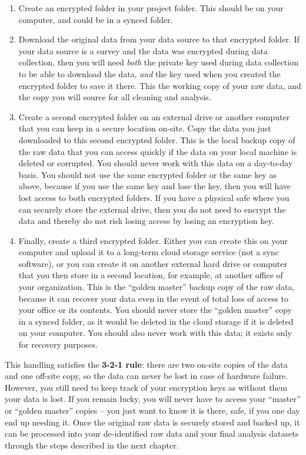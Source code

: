 \begin{enumerate}
	\item Create an encrypted folder in your project folder.
	This should be on your computer, and could be in a synced folder.

	\item Download the original data from your data source to that encrypted folder.
	If your data source is a survey and the data was encrypted during data collection,
	then you will need \textit{both} the
	private key used during data collection to be able to download the data,
	\textit{and} the key used when you created the encrypted folder to save it there.
	This the working copy of your raw data, and the copy you will source for all cleaning and analysis.

	\item Create a second encrypted folder on an external drive or another computer that you can keep in a secure location on-site.
	Copy the data you just downloaded to this second encrypted folder.
	This is the local backup copy of the raw data
	that you can access quickly if the data on your local machine is deleted or corrupted.
	You should never work with this data on a day-to-day basis.
	You should not use the same encrypted folder or the same key as above,
	because if you use the same key and lose the key,
	then you will have lost access to both encrypted folders.
	If you have a physical safe where you can securely store the external drive,
	then you do not need to encrypt the data
	and thereby do not risk losing access by losing an encryption key.

	\item Finally, create a third encrypted folder.
	Either you can create this on your computer and upload it to a long-term cloud storage service (not a sync software),
	or you can create it on	another external hard drive or computer that you then store in a second location,
	for example, at another office of your organization.
	This is the ``golden master'' backup copy of the raw data,
	because it can recover your data even in the event of
	total loss of access to your office or its contents.
	You should never store the ``golden master'' copy in a synced folder,
	as it would be deleted in the cloud storage if it is deleted on your computer.
	You should also never work with this data;
	it exists only for recovery purposes.
\end{enumerate}

\noindent This handling satisfies the \textbf{3-2-1 rule}:
there are two on-site copies of the data and one off-site copy,
so the data can never be lost in case of hardware failure.
However, you still need to keep track of your encryption keys as without them your data is lost.
If you remain lucky, you will never have to access your ``master'' or ``golden master'' copies --
you just want to know it is there, safe, if you one day end up needing it.
Once the original raw data is securely stored and backed up,
it can be processed into your de-identified raw data
and your final analysis datasets
through the steps described in the next chapter.
